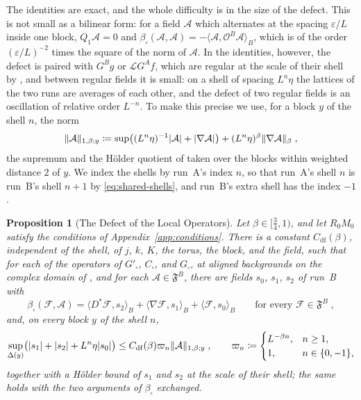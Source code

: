 \documentclass[11pt]{preprint}
\DeclarePairedDelimiter{\abs}{\lvert}{\rvert}
\DeclarePairedDelimiter{\norm}{\lVert}{\rVert}
\numberwithin{equation}{section}
\newtheorem{proposition}[theorem]{Proposition}
\theoremstyle{definition}
\theoremstyle{remark}
\theoremstyle{plain}
\begin{document}
The identities are exact, and the whole difficulty is in the size of the defect. This is not small as a bilinear form: for a field $\mathcal A$ which alternates at the spacing $\varepsilon/L$ inside one block, $Q_1\mathcal A = 0$ and $\beta_\square(\mathcal A, \mathcal A) = -\langle\mathcal A, \mathcal O^B\mathcal A\rangle_B$, which is of the order $(\varepsilon/L)^{-2}$ times the square of the norm of $\mathcal A$. In the identities, however, the defect is paired with $G^Bg$ or $\mathcal LG^Af$, which are regular at the scale of their shell by \cite[(3.43)]{BalabanPBG}, and between regular fields it is small: on a shell of spacing $L^n\eta$ the lattices of the two runs are averages of each other, and the defect of two regular fields is an oscillation of relative order $L^{-n}$. To make this precise we use, for a block $y$ of the shell $n$, the norm
\begin{equation}\label{eq:shell-norm}
    \norm{\mathcal A}_{1,\beta;y} \coloneqq \sup\bigl((L^n\eta)^{-1}\abs{\mathcal A} + \abs{\nabla\mathcal A}\bigr) + (L^n\eta)^\beta\norm{\nabla\mathcal A}_\beta\;,
\end{equation}
the supremum and the H\"older quotient of \cite[(3.40)]{BalabanPBG} taken over the blocks within weighted distance $2$ of $y$. We index the shells by run~A's index $n$, so that run~A's shell $n$ is run~B's shell $n + 1$ by \eqref{eq:shared-shells}, and run~B's extra shell has the index $-1$.

\begin{proposition}[The Defect of the Local Operators]\label{prop:local-defect}
Let $\beta \in [\frac34, 1)$, and let $R_0M_0$ satisfy the conditions of Appendix~\ref{app:conditions}. There is a constant $C_{\mathrm{df}}(\beta)$, independent of the shell, of $j$, $k$, $K$, the torus, the block, and the field, such that for each of the operators of $G'_\square$, $C_\square$, and $G_\square$, at aligned backgrounds on the complex domain of \cite[(3.37)]{BalabanPBG}, and for each $\mathcal A \in \mathfrak F^B$, there are fields $s_0$, $s_1$, $s_2$ of run~B with
\begin{equation}\label{eq:defect-form}
    \beta_\square(\mathcal F, \mathcal A) = \langle D^*\mathcal F, s_2\rangle_B + \langle\nabla\mathcal F, s_1\rangle_B + \langle\mathcal F, s_0\rangle_B
    \qquad\text{for every } \mathcal F \in \mathfrak F^B\;,
\end{equation}
and, on every block $y$ of the shell $n$,
\begin{equation}\label{eq:defect-sources}
    \sup_{\Delta(y)}\bigl(\abs{s_1} + \abs{s_2} + L^n\eta\abs{s_0}\bigr) \leq C_{\mathrm{df}}(\beta)\varpi_n\norm{\mathcal A}_{1,\beta;y}\;,
    \qquad
    \varpi_n \coloneqq \begin{cases} L^{-\beta n}, & n \geq 1,\\ 1, & n \in \{ 0, -1 \}, \end{cases}
\end{equation}
together with a H\"older bound of $s_1$ and $s_2$ at the scale of their shell; the same holds with the two arguments of $\beta_\square$ exchanged.
\end{proposition}
\end{document}
